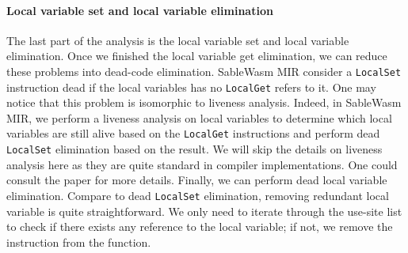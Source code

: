 \paragraph{Local variable set and local variable elimination}
The last part of the analysis is the local variable set and local variable elimination. Once we finished the local variable get elimination, we can reduce these problems into dead-code elimination. SableWasm MIR consider a \texttt{LocalSet} instruction dead if the local variables has no \texttt{LocalGet} refers to it. One may notice that this problem is isomorphic to liveness analysis. Indeed, in SableWasm MIR, we perform a liveness analysis on local variables to determine which local variables are still alive based on the \texttt{LocalGet} instructions and perform dead \texttt{LocalSet} elimination based on the result. We will skip the details on liveness analysis here as they are quite standard in compiler implementations. One could consult the paper\cite{fast-liveness} for more details. Finally, we can perform dead local variable elimination. Compare to dead \texttt{LocalSet} elimination, removing redundant local variable is quite straightforward. We only need to iterate through the use-site list to check if there exists any reference to the local variable; if not, we remove the instruction from the function.